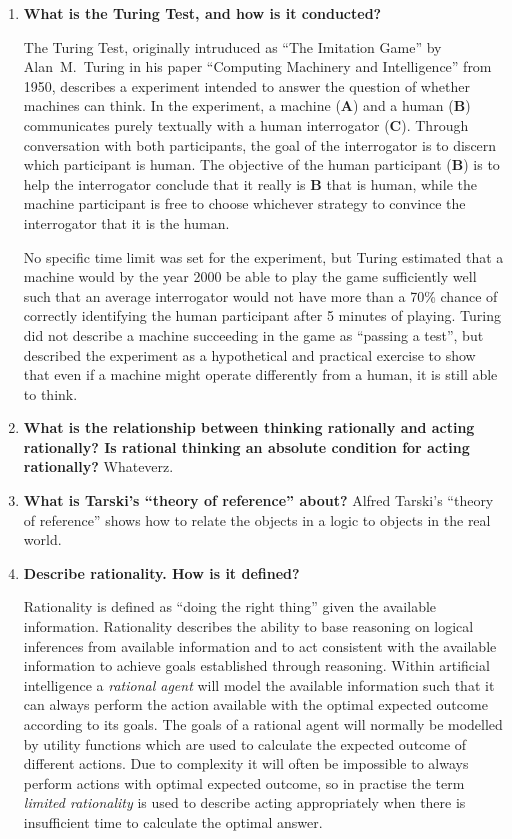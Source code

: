 \begin{enumerate}
\item \textbf{What is the Turing Test, and how is it conducted?}

The Turing Test, originally intruduced as ``The Imitation Game'' by Alan~M.~Turing in his paper ``Computing Machinery and Intelligence'' from 1950, describes a experiment intended to answer the question of whether machines can think. In the experiment, a machine (\textbf{A}) and a human (\textbf{B}) communicates purely textually with a human interrogator (\textbf{C}). Through conversation with both participants, the goal of the interrogator is to discern which participant is human. The objective of the human participant (\textbf{B}) is to help the interrogator conclude that it really is \textbf{B} that is human, while the machine participant is free to choose whichever strategy to convince the interrogator that it is the human.

No specific time limit was set for the experiment, but Turing estimated that a machine would by the year 2000 be able to play the game sufficiently well such that an average interrogator would not have more than a 70\% chance of correctly identifying the human participant after 5 minutes of playing. Turing did not describe a machine succeeding in the game as ``passing a test'', but described the experiment as a hypothetical and practical exercise to show that even if a machine might operate differently from a human, it is still able to think. 

\item \textbf{What is the relationship between thinking rationally and acting rationally? Is rational thinking an absolute condition for acting rationally?}
Whateverz.


\item \textbf{What is Tarski's ``theory of reference'' about?}
Alfred Tarski's ``theory of reference'' shows how to relate the objects in a logic to objects in the real world.

\item \textbf{Describe rationality. How is it defined?}

Rationality is defined as ``doing the right thing'' given the available information. Rationality describes the ability to base reasoning on logical inferences from available information and to act consistent with the available information to achieve goals established through reasoning. Within artificial intelligence a \textit{rational agent} will model the available information such that it can always perform the action available with the optimal expected outcome according to its goals. The goals of a rational agent will normally be modelled by utility functions which are used to calculate the expected outcome of different actions. Due to complexity it will often be impossible to always perform actions with optimal expected outcome, so in practise the term \textit{limited rationality} is used to describe acting appropriately when there is insufficient time to calculate the optimal answer.

\end{enumerate}



